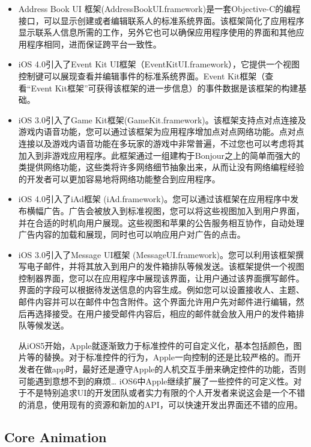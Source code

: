\begin{itemize}
    \item Address Book UI 框架(AddressBookUI.framework)是一套Objective-C的编程接口，可以显示创建或者编辑联系人的标准系统界面。该框架简化了应用程序显示联系人信息所需的工作，另外它也可以确保应用程序使用的界面和其他应用程序相同，进而保证跨平台一致性。
    \item iOS 4.0引入了Event Kit UI框架（EventKitUI.framework），它提供一个视图控制键可以展现查看并编辑事件的标准系统界面。Event Kit框架（查看“Event Kit框架”可获得该框架的进一步信息）的事件数据是该框架的构建基础。
    \item iOS 3.0引入了Game Kit框架(GameKit.framework)。该框架支持点对点连接及游戏内语音功能，您可以通过该框架为应用程序增加点对点网络功能。点对点连接以及游戏内语音功能在多玩家的游戏中非常普遍，不过您也可以考虑将其加入到非游戏应用程序。此框架通过一组建构于Bonjour之上的简单而强大的类提供网络功能，这些类将许多网络细节抽象出来，从而让没有网络编程经验的开发者可以更加容易地将网络功能整合到应用程序。
    \item iOS 4.0引入了iAd框架 (iAd.framework)。您可以通过该框架在应用程序中发布横幅广告。广告会被放入到标准视图，您可以将这些视图加入到用户界面，并在合适的时机向用户展现。这些视图和苹果的公告服务相互协作，自动处理广告内容的加载和展现，同时也可以响应用户对广告的点击。
    \item iOS 3.0引入了Message UI框架 (MessageUI.framework)。您可以利用该框架撰写电子邮件，并将其放入到用户的发件箱排队等候发送。该框架提供一个视图控制器界面，您可以在应用程序中展现该界面，让用户通过该界面撰写邮件。界面的字段可以根据待发送信息的内容生成。例如您可以设置接收人、主题、邮件内容并可以在邮件中包含附件。这个界面允许用户先对邮件进行编辑，然后再选择接受。在用户接受邮件内容后，相应的邮件就会放入用户的发件箱排队等候发送。

从iOS5开始，Apple就逐渐致力于标准控件的可自定义化，基本包括颜色，图片等的替换。对于标准控件的行为，Apple一向控制的还是比较严格的。而开发者在做app时，最好还是遵守Apple的人机交互手册来确定控件的功能，否则可能遇到意想不到的麻烦…
iOS6中Apple继续扩展了一些控件的可定义性。对于不是特别追求UI的开发团队或者实力有限的个人开发者来说这会是一个不错的消息，使用现有的资源和新加的API，可以快速开发出界面还不错的应用。

\end{itemize}

\subsection{Core Animation}

